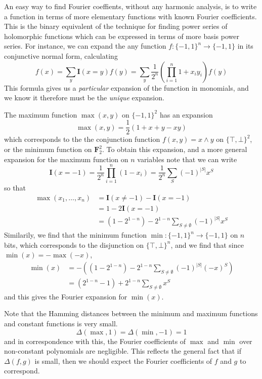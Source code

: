 An easy way to find Fourier coeffients, without any harmonic analysis, is to write a function in terms of more elementary functions with known Fourier coefficients. This is the binary equivalent of the technique for finding power series of holomorphic functions which can be expressed in terms of more basis power series. For instance, we can expand the any function $f: \{ -1, 1 \}^n \to \{ -1, 1 \}$ in its conjunctive normal form, calculating
%
\[ f(x) = \sum_y \mathbf{I}(x = y) f(y) = \sum_y \frac{1}{2^n} \left( \prod_{i = 1}^n 1 + x_iy_i \right) f(y) \]
%
This formula gives us a {\it particular} expansion of the function in monomials, and we know it therefore must be the {\it unique} expansion.

\begin{example}
    The maximum function $\max(x,y)$ on $\{ -1, 1 \}^2$ has an expansion
    \[ \max(x,y) = \frac{1}{2} \left( 1 + x + y - xy \right) \]
    which corresponds to the the conjunction function $f(x,y) = x \wedge y$ on $\{ \top, \bot \}^2$, or the minimum function on $\mathbf{F}_2^2$. To obtain this expansion, and a more general expansion for the maximum function on $n$ variables note that we can write
    \[ \mathbf{I}(x = -1) = \frac{1}{2^n} \prod_{i = 1}^n (1 - x_i) = \frac{1}{2^n} \sum_S (-1)^{|S|} x^S \]
    so that
    \begin{align*}
        \max(x_1, \dots, x_n) &= \mathbf{I}(x \neq -1) - \mathbf{I}(x = -1)\\
        &= 1 - 2 \mathbf{I}(x = -1)\\
        &= (1 - 2^{1-n}) - 2^{1-n} \sum_{S \neq \emptyset} (-1)^{|S|} x^S
    \end{align*}
    Similarily, we find that the minimum function $\min: \{ -1, 1 \}^n \to \{ -1, 1 \}$ on $n$ bits, which corresponds to the disjunction on $\{ \top, \bot \}^n$, and we find that since $\min(x) = -\max(-x)$,
    \begin{align*}
        \min(x) &= - \left( ( 1 - 2^{1-n} ) - 2^{1-n} \sum_{S \neq \emptyset} (-1)^{|S|} (-x)^S \right)\\
        &= ( 2^{1-n} - 1 ) + 2^{1-n} \sum_{S \neq \emptyset} x^S
    \end{align*}
    and this gives the Fourier expansion for $\min(x)$.
\end{example}

Note that the Hamming distances between the minimum and maximum functions and constant functions is very small.
%
\[ \Delta(\max, 1) = \Delta(\min, -1) = 1 \]
%
and in correspondence with this, the Fourier coefficients of $\max$ and $\min$ over non-constant polynomials  are negligible. This reflects the general fact that if $\Delta(f,g)$ is small, then we should expect the Fourier coefficients of $f$ and $g$ to correspond.


